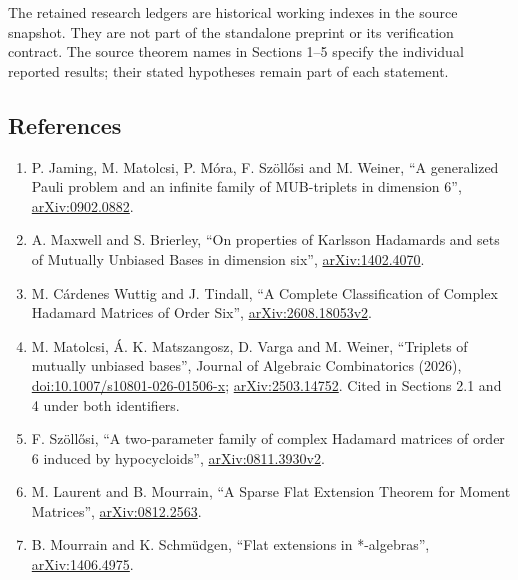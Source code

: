 \documentclass[
]{article}
\providecommand{\tightlist}{%
  \setlength{\itemsep}{0pt}\setlength{\parskip}{0pt}}
\begin{document}
The retained research ledgers are historical working indexes in the
source snapshot. They are not part of the standalone preprint or its
verification contract. The source theorem names in Sections 1--5 specify
the individual reported results; their stated hypotheses remain part of
each statement.

\subsection{References}\label{references}

\begin{enumerate}
\def\labelenumi{\arabic{enumi}.}
\tightlist
\item
  P. Jaming, M. Matolcsi, P. Móra, F. Szöllősi and M. Weiner, ``A
  generalized Pauli problem and an infinite family of MUB-triplets in
  dimension 6'',
  \href{https://arxiv.org/abs/0902.0882v2}{arXiv:0902.0882}.
\item
  A. Maxwell and S. Brierley, ``On properties of Karlsson Hadamards and
  sets of Mutually Unbiased Bases in dimension six'',
  \href{https://arxiv.org/abs/1402.4070v2}{arXiv:1402.4070}.
\item
  M. Cárdenes Wuttig and J. Tindall, ``A Complete Classification of
  Complex Hadamard Matrices of Order Six'',
  \href{https://arxiv.org/abs/2608.18053v2}{arXiv:2608.18053v2}.
\item
  M. Matolcsi, Á. K. Matszangosz, D. Varga and M. Weiner, ``Triplets of
  mutually unbiased bases'', Journal of Algebraic Combinatorics (2026),
  \href{https://doi.org/10.1007/s10801-026-01506-x}{doi:10.1007/s10801-026-01506-x};
  \href{https://arxiv.org/abs/2503.14752}{arXiv:2503.14752}. Cited in
  Sections 2.1 and 4 under both identifiers.
\item
  F. Szöllősi, ``A two-parameter family of complex Hadamard matrices of
  order 6 induced by hypocycloids'',
  \href{https://arxiv.org/abs/0811.3930v2}{arXiv:0811.3930v2}.
\item
  M. Laurent and B. Mourrain, ``A Sparse Flat Extension Theorem for
  Moment Matrices'',
  \href{https://arxiv.org/abs/0812.2563}{arXiv:0812.2563}.
\item
  B. Mourrain and K. Schmüdgen, ``Flat extensions in *-algebras'',
  \href{https://arxiv.org/abs/1406.4975}{arXiv:1406.4975}.
\end{enumerate}
\end{document}
